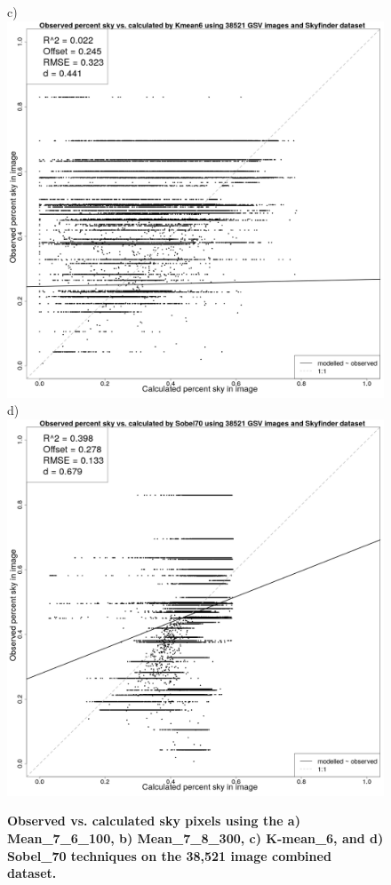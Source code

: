 \documentclass[final,3p,times,authoryear]{elsarticle}
\begin{document}
\begin{figure}
c)\includegraphics[scale=0.15]{Images/ErrorPlotsCombinedIndivKmean6.png}
d)\includegraphics[scale=0.15]{Images/ErrorPlotsCombinedIndivSobel70.png}
\caption{\textbf{Observed vs. calculated sky pixels using the a) Mean\_7\_6\_100, b) Mean\_7\_8\_300, c) K-mean\_6, and d) Sobel\_70 techniques on the 38,521 image combined dataset.} }
\label{fig:errorallcombined}
\end{figure}
\end{document}
